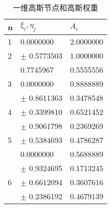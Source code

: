 \begin{table}[H]
	\centering
	\caption{一维高斯节点和高斯权重}
	\label{table02}
	\begin{tabular}{lll}
\hline n & $ \xi_{i},\eta_j $ & $ A_{i} $ \\
\hline 1 & 0.0000000 & 2.0000000 \\
\hline 2 & $ \pm $ 0.5773503 & 1.0000000 \\
\hline & 0.7745967 & 0.5555556 \\
3 & 0.0000000 & 0.8888889 \\
\hline & $ \pm $ 0.8611363 & 0.3478548 \\
4 & $ \pm $ 0.3399810 & 0.6521452 \\
\hline & $ \pm $ 0.9061798 & 0.2369269 \\
5 & $ \pm $ 0.5384693 & 0.4786287 \\
& 0.0000000 & 0.5688889 \\
\hline & $ \pm $ 0.9324695 & 0.1713245 \\
6 & $ \pm $ 0.6612094 & 0.3607616 \\
& $ \pm $ 0.2386192 & 0.4679139 \\
\hline
\end{tabular}
\end{table}